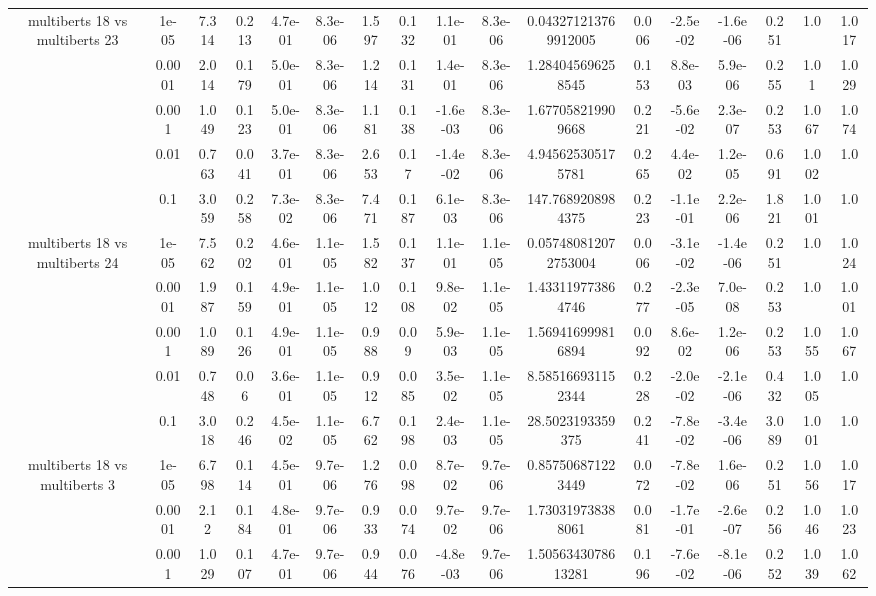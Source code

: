 \begin{tabular}{|c|c|c|c|c|c|c|c|c|c|c|c|c|c|c|c|c|}
\hline
\multirow{5}{*}{multiberts 18 vs multiberts 23} & 1e-05 & 7.314 & 0.213 & 4.7e-01 & 8.3e-06 & 1.597 & 0.132 & 1.1e-01 & 8.3e-06 & 0.043271213769912005 & 0.006 & -2.5e-02 & -1.6e-06 & 0.251 & 1.0 & 1.017 \\
 & 0.0001 & 2.014 & 0.179 & 5.0e-01 & 8.3e-06 & 1.214 & 0.131 & 1.4e-01 & 8.3e-06 & 1.284045696258545 & 0.153 & 8.8e-03 & 5.9e-06 & 0.255 & 1.01 & 1.029 \\
 & 0.001 & 1.049 & 0.123 & 5.0e-01 & 8.3e-06 & 1.181 & 0.138 & -1.6e-03 & 8.3e-06 & 1.677058219909668 & 0.221 & -5.6e-02 & 2.3e-07 & 0.253 & 1.067 & 1.074 \\
 & 0.01 & 0.763 & 0.041 & 3.7e-01 & 8.3e-06 & 2.653 & 0.17 & -1.4e-02 & 8.3e-06 & 4.945625305175781 & 0.265 & 4.4e-02 & 1.2e-05 & 0.691 & 1.002 & 1.0 \\
 & 0.1 & 3.059 & 0.258 & 7.3e-02 & 8.3e-06 & 7.471 & 0.187 & 6.1e-03 & 8.3e-06 & 147.7689208984375 & 0.223 & -1.1e-01 & 2.2e-06 & 1.821 & 1.001 & 1.0 \\
\hline
\multirow{5}{*}{multiberts 18 vs multiberts 24} & 1e-05 & 7.562 & 0.202 & 4.6e-01 & 1.1e-05 & 1.582 & 0.137 & 1.1e-01 & 1.1e-05 & 0.057480812072753004 & 0.006 & -3.1e-02 & -1.4e-06 & 0.251 & 1.0 & 1.024 \\
 & 0.0001 & 1.987 & 0.159 & 4.9e-01 & 1.1e-05 & 1.012 & 0.108 & 9.8e-02 & 1.1e-05 & 1.433119773864746 & 0.277 & -2.3e-05 & 7.0e-08 & 0.253 & 1.0 & 1.001 \\
 & 0.001 & 1.089 & 0.126 & 4.9e-01 & 1.1e-05 & 0.988 & 0.09 & 5.9e-03 & 1.1e-05 & 1.569416999816894 & 0.092 & 8.6e-02 & 1.2e-06 & 0.253 & 1.055 & 1.067 \\
 & 0.01 & 0.748 & 0.06 & 3.6e-01 & 1.1e-05 & 0.912 & 0.085 & 3.5e-02 & 1.1e-05 & 8.585166931152344 & 0.228 & -2.0e-02 & -2.1e-06 & 0.432 & 1.005 & 1.0 \\
 & 0.1 & 3.018 & 0.246 & 4.5e-02 & 1.1e-05 & 6.762 & 0.198 & 2.4e-03 & 1.1e-05 & 28.5023193359375 & 0.241 & -7.8e-02 & -3.4e-06 & 3.089 & 1.001 & 1.0 \\
\hline
\multirow{5}{*}{multiberts 18 vs multiberts 3} & 1e-05 & 6.798 & 0.114 & 4.5e-01 & 9.7e-06 & 1.276 & 0.098 & 8.7e-02 & 9.7e-06 & 0.857506871223449 & 0.072 & -7.8e-02 & 1.6e-06 & 0.251 & 1.056 & 1.017 \\
 & 0.0001 & 2.12 & 0.184 & 4.8e-01 & 9.7e-06 & 0.933 & 0.074 & 9.7e-02 & 9.7e-06 & 1.730319738388061 & 0.081 & -1.7e-01 & -2.6e-07 & 0.256 & 1.046 & 1.023 \\
 & 0.001 & 1.029 & 0.107 & 4.7e-01 & 9.7e-06 & 0.944 & 0.076 & -4.8e-03 & 9.7e-06 & 1.5056343078613281 & 0.196 & -7.6e-02 & -8.1e-06 & 0.252 & 1.039 & 1.062 \\

\end{tabular}
